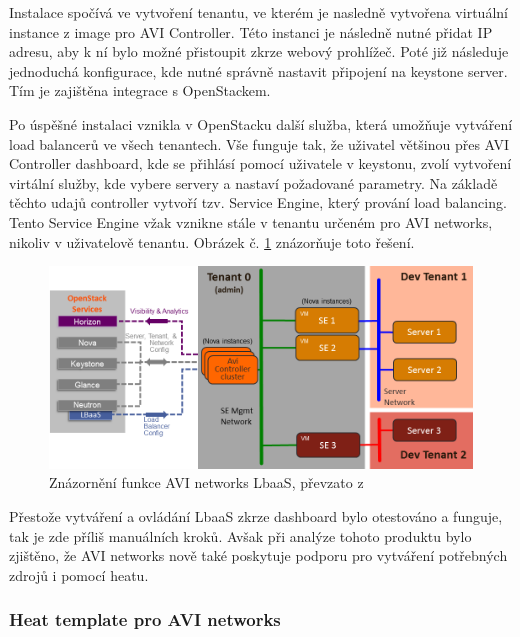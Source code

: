 Instalace spočívá ve vytvoření tenantu, ve kterém je nasledně vytvořena virtuální instance z image pro AVI Controller. Této instanci je následně nutné přidat IP adresu, aby k ní bylo možné přistoupit zkrze webový prohlížeč. Poté již následuje jednoduchá konfigurace, kde nutné správně nastavit připojení na keystone server. Tím je zajištěna integrace s OpenStackem. 

Po úspěšné instalaci vznikla v OpenStacku další služba, která umožňuje vytváření load balancerů ve všech tenantech. Vše funguje tak, že uživatel většinou přes AVI Controller dashboard, kde se přihlásí pomocí uživatele v keystonu, zvolí vytvoření virtální služby, kde vybere servery a nastaví požadované parametry. Na základě těchto udajů controller vytvoří tzv. Service Engine, který prování load balancing. Tento Service Engine vžak vznikne stále v tenantu určeném pro AVI networks, nikoliv v uživatelově tenantu. Obrázek č. \ref{fig:avi} znázorňuje toto řešení.

\begin{figure}[h]
\begin{centering}
\includegraphics[scale=0.5]{images/avi}
\par\end{centering}
\caption{Znázornění funkce AVI networks LbaaS, převzato z \cite{avi_networks} \label{fig:avi}}
\end{figure}

Přestože vytváření a ovládání LbaaS zkrze dashboard bylo otestováno a funguje, tak je zde příliš manuálních kroků. Avšak při analýze tohoto produktu bylo zjištěno, že AVI networks nově také poskytuje podporu pro vytváření potřebných zdrojů i pomocí heatu. 

\subsubsection{Heat template pro AVI networks}


